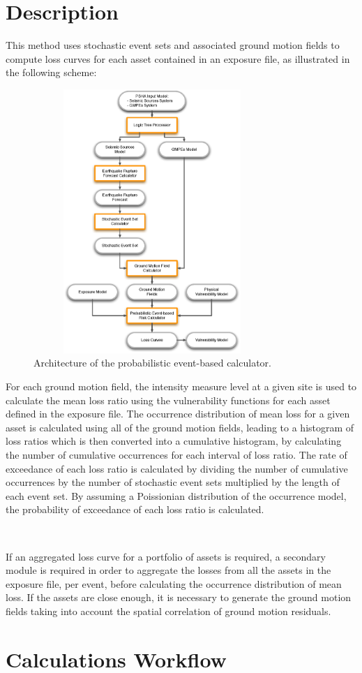 \section{Description}
This method uses stochastic event sets and associated ground motion fields to compute loss curves for each asset contained in an exposure file, as illustrated in the following scheme:  

\begin{figure}[ht]
\centering
\includegraphics[width=9cm,height=10cm]{./Figures/Part_Risk/Scheme_Prob_calc.eps}
\caption{Architecture of the probabilistic event-based calculator.}
\label{fig:Scheme_Prob_calc}
\end{figure}

For each ground motion field, the intensity measure level at a given site is used to calculate the mean loss ratio using the vulnerability functions for each asset defined in the exposure file. The occurrence distribution of mean loss for a given asset is calculated using all of the ground motion fields, leading to a histogram of loss ratios which is then converted into a cumulative histogram, by calculating the number of cumulative occurrences for each interval of loss ratio. The rate of exceedance of each loss ratio is calculated by dividing the number of cumulative occurrences by the number of stochastic event sets multiplied by the length of each event set. By assuming a Poissionian distribution of the occurrence model, the probability of exceedance of each loss ratio is calculated. 
 
\par \ 
\par
 
If an aggregated loss curve for a portfolio of assets is required, a secondary module is required in order to aggregate the losses from all the assets in the exposure file, per event, before calculating the occurrence distribution of mean loss. If the assets are close enough, it is necessary to generate the ground motion fields taking into account the spatial correlation of ground motion residuals. 

\section{Calculations Workflow}



